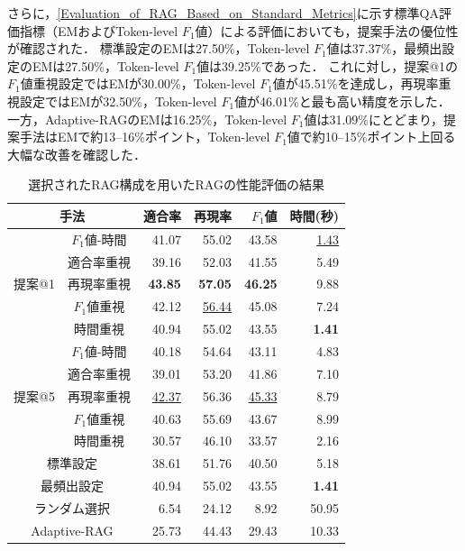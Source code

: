 さらに，\ref{Evaluation_of_RAG_Based_on_Standard_Metrics}に示す標準QA評価指標（EMおよびToken-level $F_1$値）による評価においても，提案手法の優位性が確認された．
標準設定のEMは27.50\%，Token-level $F_1$値は37.37\%，最頻出設定のEMは27.50\%，Token-level $F_1$値は39.25\%であった．
これに対し，提案@1の$F_1$値重視設定ではEMが30.00\%，Token-level $F_1$値が45.51\%を達成し，再現率重視設定ではEMが32.50\%，Token-level $F_1$値が46.01\%と最も高い精度を示した．
一方，Adaptive-RAGのEMは16.25\%，Token-level $F_1$値は31.09\%にとどまり，提案手法はEMで約13--16\%ポイント，Token-level $F_1$値で約10--15\%ポイント上回る大幅な改善を確認した．

\begin{table}[tb]
 \caption{選択されたRAG構成を用いたRAGの性能評価の結果}
 \label{Evaluation_of_RAG_Based_on_Selection_Results}
 \centering
 \footnotesize
 \begin{tabular}{ccrrrr}
    \toprule
    \multicolumn{2}{c}{手法} & 適合率 & 再現率 & $F_1$値 & 時間(秒) \\
    \midrule
    \multirow{5}{*}{提案@1} 
    & $F_1$値-時間 & 41.07 & 55.02 & 43.58 & \underline{1.43} \\
    & 適合率重視 & 39.16 & 52.03 & 41.55 & 5.49 \\
    & 再現率重視 & \textbf{43.85} & \textbf{57.05} & \textbf{46.25} & 9.88 \\
    & $F_1$値重視 & 42.12 & \underline{56.44} & 45.08 & 7.24 \\
    & 時間重視 & 40.94 & 55.02 & 43.55 & \textbf{1.41} \\
    \midrule
    \multirow{5}{*}{提案@5} 
    & $F_1$値-時間 & 40.18 & 54.64 & 43.11 & 4.83 \\
    & 適合率重視 & 39.01 & 53.20 & 41.86 & 7.10 \\
    & 再現率重視 & \underline{42.37} & 56.36 & \underline{45.33} & 8.79 \\
    & $F_1$値重視 & 40.63 & 55.69 & 43.67 & 8.99 \\
    & 時間重視 & 30.57 & 46.10 & 33.57 & 2.16 \\
    \midrule
    \multicolumn{2}{c}{標準設定} & 38.61 & 51.76 & 40.50 & 5.18 \\
    \multicolumn{2}{c}{最頻出設定} & 40.94 & 55.02 & 43.55 & \textbf{1.41} \\
    \multicolumn{2}{c}{ランダム選択} & 6.54 & 24.12 & 8.92 & 50.95 \\
    \multicolumn{2}{c}{Adaptive-RAG} & 25.73 & 44.43 & 29.43 & 10.33 \\
    \midrule

\end{tabular}
\end{table}
